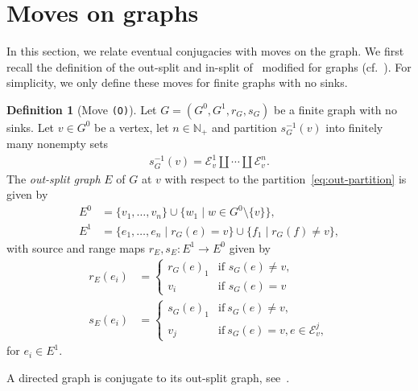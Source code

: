 \documentclass[12pt,a4paper,oneside,reqno,final]{amsart}
\newcommand{\LRA}{\longrightarrow}
\newcommand{\N}{\mathbb{N}}
\newcommand{\E}{\mathcal{E}}
\theoremstyle{definition}
\newtheorem{definition}[lemma]{Definition}
\numberwithin{equation}{section} %
\begin{document}
\section{Moves on graphs}
\label{moves}

In this section, we relate eventual conjugacies with moves on the graph.
We first recall the definition of the out-split and in-split of~\cite{Williams1973} modified for graphs (cf.~\cite{LM, Bates-Pask2004}).
For simplicity, we only define these moves for finite graphs with no sinks.

\begin{definition}[Move \texttt{(O)}]
   Let $G = (G^0, G^1, r_G, s_G)$ be a finite graph with no sinks.  
   Let $v\in G^0$ be a vertex, let $n\in \N_+$ and partition $s_G^{-1}(v)$ into finitely many nonempty sets
   \begin{align} \label{eq:out-partition}
       s_G^{-1}(v) = \E_v^1 \amalg \cdots \amalg\E_v^n.
   \end{align}
   The \emph{out-split graph} $E$ of $G$ at $v$ with respect to the partition~\eqref{eq:out-partition} is given by
   \begin{align*}
       E^0 &= \{ v_1,\ldots,v_n \} \cup \{w_1 \mid w\in G^0\setminus \{v\}\}, \\
       E^1 &= \{ e_1,\ldots,e_n \mid r_G(e) = v\} \cup \{ f_1 \mid r_G(f) \neq v\},
   \end{align*}
   with source and range maps $r_E, s_E\colon E^1\LRA E^0$ given by
    \begin{align*}
        r_E(e_i) &= 
        \begin{cases}
            r_G(e)_1    & \textrm{if } s_G(e)\neq v, \\
            v_i    & \textrm{if } s_G(e) = v
        \end{cases}\\
        s_E(e_i) &=
        \begin{cases}
            s_G(e)_1    & \textrm{if}~s_G(e)\neq v, \\
            v_j         & \textrm{if}~s_G(e) = v, e\in \E_v^j,
        \end{cases}
    \end{align*}
    for $e_i\in E^1$.
\end{definition}

A directed graph is conjugate to its out-split graph, see~\cite[Corollary 6.2]{BCW2017}.
\end{document}
